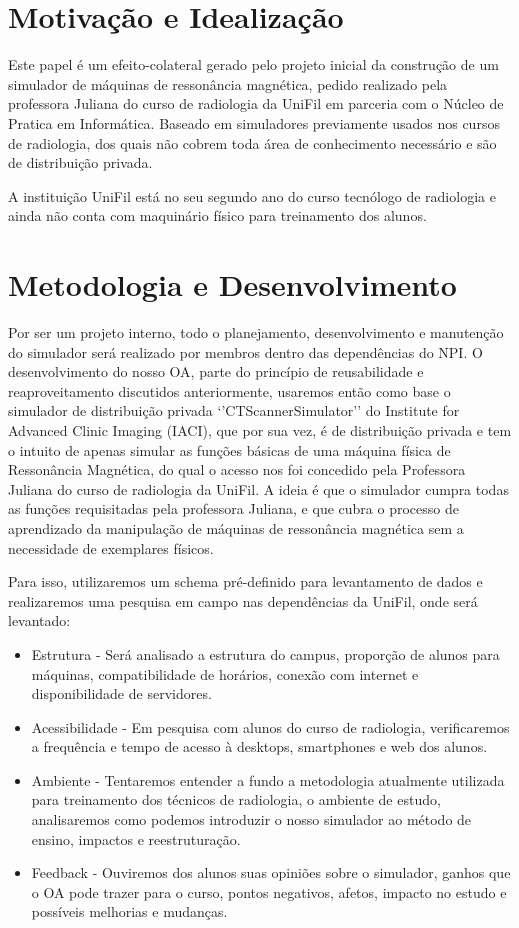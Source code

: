 \documentclass[12pt,openright,oneside,a4paper,english,french,spanish,brazil]{unifil}
\begin{document}
\chapter{Motivação e Idealização}%

Este papel é um efeito-colateral gerado pelo projeto inicial da construção de um simulador de máquinas de ressonância magnética, pedido realizado pela professora Juliana do curso de radiologia da UniFil em parceria com o Núcleo de Pratica em Informática. Baseado em simuladores previamente usados nos cursos de radiologia, dos quais não cobrem toda área de conhecimento necessário e são de distribuição privada.

A instituição UniFil está no seu segundo ano do curso tecnólogo de radiologia e ainda não conta com maquinário físico para treinamento dos alunos.

\chapter {Metodologia e Desenvolvimento}
Por ser um projeto interno, todo o planejamento, desenvolvimento e manutenção do simulador será realizado por membros dentro das dependências do NPI.
O desenvolvimento do nosso OA, parte do princípio de reusabilidade e reaproveitamento discutidos anteriormente, usaremos então como base o simulador de distribuição privada `'CTScannerSimulator'' do Institute for Advanced Clinic Imaging (IACI), que por sua vez, é de distribuição privada e tem o intuito de apenas simular as funções básicas de uma máquina física de Ressonância Magnética, do qual o acesso nos foi concedido pela Professora Juliana do curso de radiologia da UniFil. A ideia é que o simulador cumpra todas as funções requisitadas pela professora Juliana,  e que cubra o processo de aprendizado da manipulação de máquinas de ressonância magnética sem a necessidade de exemplares físicos. 

\par Para isso, utilizaremos um schema pré-definido para levantamento de dados e realizaremos uma pesquisa em campo nas dependências da UniFil, onde será levantado:
\begin{itemize}
\item Estrutura - Será analisado a estrutura do campus, proporção de alunos para máquinas, compatibilidade de horários, conexão com internet e disponibilidade de servidores.
\item Acessibilidade - Em pesquisa com alunos do curso de radiologia, verificaremos a frequência e tempo de acesso à desktops, smartphones e web dos alunos.
\item Ambiente - Tentaremos entender a fundo a metodologia atualmente utilizada para treinamento dos técnicos de radiologia, o ambiente de estudo, analisaremos como podemos introduzir o nosso simulador ao método de ensino, impactos e reestruturação.
\item Feedback - Ouviremos dos alunos suas opiniões sobre o simulador, ganhos que o OA pode trazer para o curso, pontos negativos, afetos, impacto no estudo e possíveis melhorias e mudanças.
\end{itemize}
\end{document}
